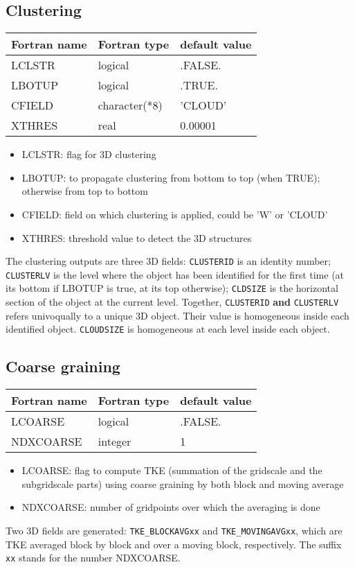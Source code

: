 \subsection{Clustering}
\begin{center}
\begin{tabular} {|l|l|l|}
\hline
Fortran name  & Fortran type & default value \\
\hline
LCLSTR       & logical     & .FALSE.   \\
LBOTUP       & logical     & .TRUE.   \\
CFIELD       & character(*8) & 'CLOUD'    \\
XTHRES       & real        & 0.00001    \\
\hline
\end{tabular}
\end{center}
\begin{itemize}
\item LCLSTR: flag for 3D clustering
\item LBOTUP: to propagate clustering from bottom to top (when TRUE); otherwise from top to bottom
\item CFIELD: field on which clustering is applied, could be 'W' or 'CLOUD'
\item XTHRES: threshold value to detect the 3D structures
\end{itemize}

The clustering outputs are three 3D fields:
{\tt CLUSTERID} is an identity number;
{\tt CLUSTERLV} is the level where the object has been identified for the first time (at its bottom if LBOTUP is true, at its top otherwise);
{\tt CLDSIZE} is the horizontal section of the object at the current level.
Together, {\tt CLUSTERID} \textbf{and} {\tt CLUSTERLV} refers univoqually to a unique 3D object. Their value is homogeneous inside each identified object. {\tt CLOUDSIZE} is homogeneous at each level inside each object.

\subsection{Coarse graining}
\begin{center}
\begin{tabular} {|l|l|l|}
\hline
Fortran name  & Fortran type & default value \\
\hline
LCOARSE      & logical     & .FALSE.   \\
NDXCOARSE    & integer     & 1  \\
\hline
\end{tabular}
\end{center}
\begin{itemize}
\item LCOARSE: flag to compute TKE (summation of the gridscale and the subgridscale parts) using coarse graining by both block and moving average
\item NDXCOARSE: number of gridpoints over which the averaging is done
\end{itemize}

Two 3D fields are generated: {\tt TKE\_BLOCKAVGxx} and {\tt TKE\_MOVINGAVGxx}, which are TKE averaged block by block and over a moving block, respectively. The suffix {\tt xx} stands for the number NDXCOARSE.
